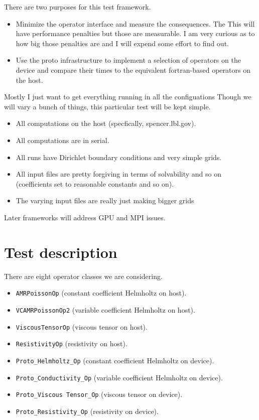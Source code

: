 \documentclass{article}
\begin{document}
There are two purposes for this test framework.
\begin{itemize}
\item Minimize the operator interface and measure the consequences.
  The This will have performance
  penalties but those are measurable.   I am very curious as to how
  big those penalties are and I will expend some effort to find out.
\item Use the proto infrastructure to implement a selection of
  operators on the device and compare their times to the equivalent
  fortran-based operators on the host.
\end{itemize}
Mostly I just want to get everything running in all the configuations
Though we will vary a bunch of things, this particular test will be
kept simple.
\begin{itemize}
  \item All computations on the host (specfically, spencer.lbl.gov).
  \item All computations are in serial.
  \item All runs have Dirichlet boundary conditions and very simple
    grids.
  \item All input files are pretty forgiving in terms of solvability
    and so on (coefficients set to reasonable constants and so on).
  \item The varying input files are really just making bigger grids
\end{itemize}
 Later frameworks will address GPU and MPI issues.

 \section{Test description}

 There are eight operator classes we are considering.
 \begin{itemize}
 \item {\tt AMRPoissonOp} (constant coefficient Helmholtz on   host).
 \item {\tt VCAMRPoissonOp2} (variable coefficient Helmholtz on host).
 \item {\tt ViscousTensorOp} (viscous tensor on host).
 \item {\tt ResistivityOp} (resistivity on host).
 \item {\tt Proto\_Helmholtz\_Op} (constant coefficient Helmholtz on device).
 \item {\tt Proto\_Conductivity\_Op} (variable coefficient Helmholtz on device).
 \item {\tt Proto\_Viscous Tensor\_Op} (viscous tensor on device).
 \item {\tt Proto\_Resistivity\_Op} (resistivity on device).
 \end{itemize}
\end{document}
